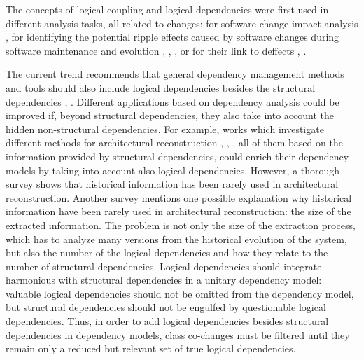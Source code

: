 \documentclass[a4paper,twoside]{article}
\begin{document}
The concepts of logical coupling and logical dependencies were first used in different analysis tasks, all related to changes: for software change impact analysis \cite{1553643}, for identifying the potential ripple effects caused by software changes during software maintenance and evolution \cite{DBLP:conf/issre/OlivaG15}, \cite{Oliva:2011:ISL:2067853.2068086}, \cite{Poshyvanyk2009}, \cite{posh2010} or for their link to deffects \cite{wiese}, \cite{Zimmermann:2004:MVH:998675.999460}.

The current trend recommends that general dependency management methods and tools should also include logical dependencies besides the structural dependencies \cite{Oliva:2011:ISL:2067853.2068086}, \cite{DBLP:journals/jss/AjienkaC17}. Different applications based on dependency analysis could be improved if, beyond structural dependencies, they also take into account the hidden non-structural dependencies. For example, works  which investigate different methods for architectural reconstruction \cite{SoraConti}, \cite{SoraSem13}, \cite{PagerankENASE},  all of them based on the information provided by structural dependencies, could enrich their dependency models by taking into account also logical dependencies. However, a thorough survey \cite{sar} shows that historical information has been rarely used in architectural reconstruction. Another survey \cite{Shtern:2012:CMS:2332427.2332428} mentions one possible explanation why historical information have been rarely used in architectural reconstruction: the size of the extracted information. The problem is not only the size of the extraction process, which has to analyze many versions from the historical evolution of the system, but also the number of the logical dependencies and how they relate to the number of structural dependencies. Logical dependencies should integrate harmonious with structural dependencies in a unitary dependency model: valuable logical dependencies should not be omitted from the dependency model, but structural dependencies should not be engulfed by questionable logical dependencies.  
Thus, in order to add logical dependencies besides structural dependencies in dependency models, class co-changes must be filtered until they remain only a reduced but relevant set of true logical dependencies. 
\end{document}
